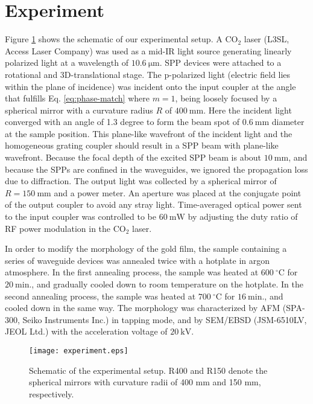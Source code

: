 \documentclass[aip,apl,reprint]{revtex4-1}
\begin{document}
\section{Experiment}
\label{sec:experiment}
Figure \ref{fig:experiment} shows the schematic of our experimental setup. 
A $\mathrm{CO_2}$ laser (L3SL, Access Laser Company) was used as a mid-IR light source generating linearly polarized light at a wavelength of $10.6\:\mathrm{\mu m}$. 
SPP devices were attached to a rotational and 3D-translational stage. 
The p-polarized light (electric field lies within the plane of incidence) was incident onto the input coupler at the angle that fulfills Eq. \ref{eq:phase-match} where $m=1$, being loosely focused by a spherical mirror with a curvature radius $R$ of $400\:\mathrm{mm}$.  Here the incident light converged with an angle of 1.3 degree to form the beam spot of $0.6\:\mathrm{mm}$ diameter at the sample position. This plane-like wavefront of the incident light and the homogeneous grating coupler should result in a SPP beam with plane-like wavefront. Because the focal depth of the excited SPP beam is about $10\:\mathrm{mm}$, and because the SPPs are confined in the waveguides, we ignored the propagation loss due to diffraction.
The output light was collected by a spherical mirror of $R=150\:\mathrm{mm}$ and a power meter. 
An aperture was placed at the conjugate point of the output coupler to avoid any stray light. 
Time-averaged optical power sent to the input coupler was controlled to be $60\:\mathrm{mW}$ by adjusting the duty ratio of RF power modulation in the $\mathrm{CO_2}$ laser.

In order to modify the morphology of the gold film, the sample containing a series of waveguide devices was annealed twice with a hotplate in argon atmosphere\cite{Nogues}.
In the first annealing process, the sample was heated at $600\:^\circ\mathrm{C}$ for $20\:\mathrm{min}$., and gradually cooled down to room temperature on the hotplate. In the second annealing process, the sample was heated at $700\:^\circ\mathrm{C}$ for $16\:\mathrm{min}$., and cooled down in the same way. The morphology was characterized by AFM (SPA-300, Seiko Instruments Inc.) in tapping mode, and by SEM/EBSD (JSM-6510LV, JEOL Ltd.) with the acceleration voltage of $20\:\mathrm{kV}$.

\begin{figure}
    \texttt{[image: experiment.eps]}
    \caption{Schematic of the experimental setup. R400 and R150 denote the spherical mirrors with curvature radii of 400 mm and 150 mm, respectively.}
     \label{fig:experiment}
\end{figure}
\end{document}
